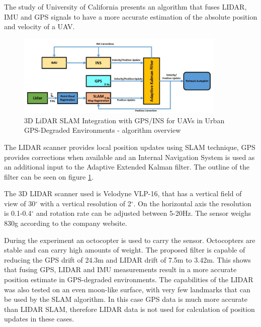 The study of University of California\cite{hening20173d} presents an algorithm that fuses LIDAR, IMU and GPS signals 
to have a more accurate estimation of the absolute position and velocity of a UAV. 
\begin{figure}[!ht]
    \centering
	\includegraphics[width=100mm, keepaspectratio]{figures/hening_filter.png}
    \caption{3D LiDAR SLAM Integration with GPS/INS for UAVs in Urban GPS-Degraded Environments \cite{hening20173d} - algorithm overview}
    \label{fig:haning_filter}
\end{figure}
The LIDAR scanner provides local position updates using SLAM technique, GPS provides corrections when available and an Internal
Navigation System is used as an additional input to the Adaptive Extended Kalman filter. The outline of the filter can be seen 
on figure \ref{fig:haning_filter}.



The 3D LIDAR scanner used is Velodyne VLP-16, that has a vertical field of view of 30$^\circ$ with a vertical resolution 
of 2$^\circ$. On the horizontal axis the resolution is 0.1-0.4$^\circ$ and rotation rate can be adjusted between 5-20Hz.
The sensor weighs 830g according to the company website.

During the experiment an octocopter is used to carry the sensor. Octocopters are stable and can carry high amounts of weight.
The proposed filter is capable of reducing the GPS drift of 24.3m and LIDAR drift of 7.5m to 3.42m.
This shows that fusing GPS, LIDAR and IMU measurements result in a more accurate position estimate in
GPS-degraded environments. The capabilities of the LIDAR was also tested on an even moon-like surface, 
with very few landmarks that can be used by the SLAM algorithm. In this case GPS data is much more 
accurate than LIDAR SLAM, therefore LIDAR data is not used for calculation of position updates in these cases.


